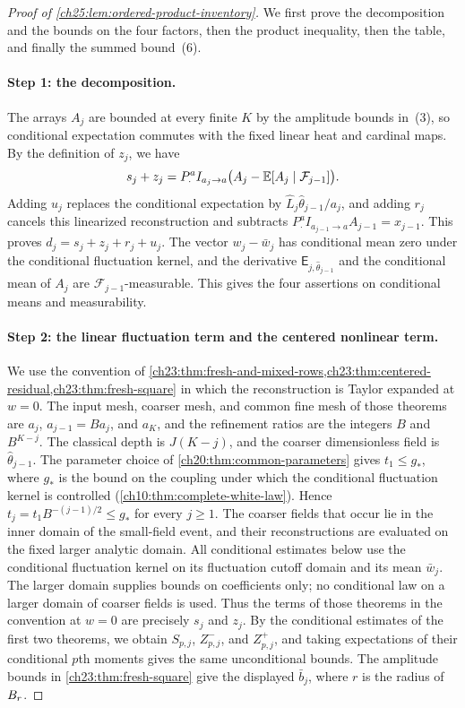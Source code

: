 \begin{proof}[Proof of \cref{ch25:lem:ordered-product-inventory}]
We first prove the decomposition and the bounds on the four factors, then the product inequality, then the table, and finally the summed bound~(6).

\paragraph{Step 1: the decomposition.}
The arrays $A_j$ are bounded at every finite $K$ by the amplitude bounds in~(3), so conditional expectation commutes with the fixed linear heat and cardinal maps. By the definition of $z_j$, we have
\[
 s_j+z_j=P_\cdot^aI_{a_j\to a}\bigl(A_j-\mathbb E[A_j\mid\mathcal F_{j-1}]\bigr).
\]
Adding $u_j$ replaces the conditional expectation by $\widehat L_j\widehat\theta_{j-1}/a_j$, and adding $r_j$ cancels this linearized reconstruction and subtracts $P_\cdot^aI_{a_{j-1}\to a}A_{j-1}=x_{j-1}$. This proves $d_j=s_j+z_j+r_j+u_j$. The vector $w_j-\bar w_j$ has conditional mean zero under the conditional fluctuation kernel, and the derivative $\mathsf E_{j,\widehat\theta_{j-1}}$ and the conditional mean of $A_j$ are $\mathcal F_{j-1}$-measurable. This gives the four assertions on conditional means and measurability.

\paragraph{Step 2: the linear fluctuation term and the centered nonlinear term.}
We use the convention of \cref{ch23:thm:fresh-and-mixed-rows,ch23:thm:centered-residual,ch23:thm:fresh-square} in which the reconstruction is Taylor expanded at $w=0$. The input mesh, coarser mesh, and common fine mesh of those theorems are $a_j$, $a_{j-1}=Ba_j$, and $a_K$, and the refinement ratios are the integers $B$ and $B^{K-j}$. The classical depth is $J(K-j)$, and the coarser dimensionless field is $\widehat\theta_{j-1}$. The parameter choice of \cref{ch20:thm:common-parameters} gives $t_1\le g_*$, where $g_*$ is the bound on the coupling under which the conditional fluctuation kernel is controlled (\cref{ch10:thm:complete-white-law}). Hence $t_j=t_1B^{-(j-1)/2}\le g_*$ for every $j\ge1$. The coarser fields that occur lie in the inner domain of the small-field event, and their reconstructions are evaluated on the fixed larger analytic domain. All conditional estimates below use the conditional fluctuation kernel on its fluctuation cutoff domain and its mean $\bar w_j$. The larger domain supplies bounds on coefficients only; no conditional law on a larger domain of coarser fields is used. Thus the terms of those theorems in the convention at $w=0$ are precisely $s_j$ and $z_j$. By the conditional estimates of the first two theorems, we obtain $S_{p,j}$, $Z^-_{p,j}$, and $Z^+_{p,j}$, and taking expectations of their conditional $p$th moments gives the same unconditional bounds. The amplitude bounds in \cref{ch23:thm:fresh-square} give the displayed $\bar b_j$, where $r$ is the radius of $B_{r}$.


\end{proof}

